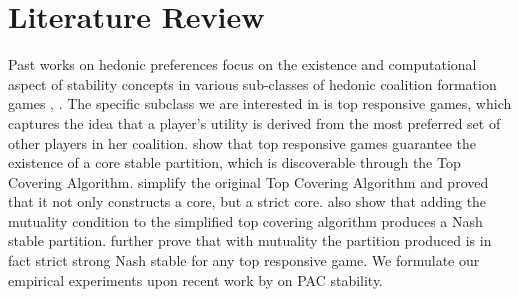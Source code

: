 \chapter{Literature Review}
\label{ch:review}
\vspace{2em}

Past works on hedonic preferences focus on the existence and computational aspect
of stability concepts in various sub-classes of hedonic coalition formation games
\cite{Aziz:2012:ESH:2343776.2343806}, \cite{aziz_savani_moulin_2016}.
The specific subclass we are interested in is top responsive games,
which captures the idea that a player's utility is derived from
the most preferred set of other players in her coalition.
 show that top responsive games guarantee
the existence of a core stable partition,
which is discoverable through the Top Covering Algorithm.
 simplify the original Top Covering Algorithm
and proved that it not only constructs a core, but a strict core.
 also show that adding the mutuality condition
to the simplified top covering algorithm produces a Nash stable partition.
 further prove that with mutuality the partition produced
is in fact strict strong Nash stable for any top responsive game.
We formulate our empirical experiments upon recent work by  on PAC stability.
